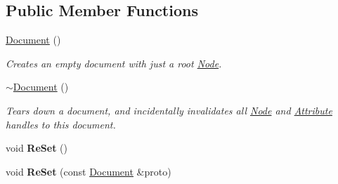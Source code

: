 \subsection*{Public Member Functions}
\begin{DoxyCompactItemize}
\item 
\hypertarget{classphys_1_1xml_1_1Document_ae1e779f0826bf3357ff77846155aad7d}{
\hyperlink{classphys_1_1xml_1_1Document_ae1e779f0826bf3357ff77846155aad7d}{Document} ()}
\label{dd/d44/classphys_1_1xml_1_1Document_ae1e779f0826bf3357ff77846155aad7d}

\begin{DoxyCompactList}\small\item\em Creates an empty document with just a root \hyperlink{classphys_1_1xml_1_1Node}{Node}. \item\end{DoxyCompactList}\item 
\hypertarget{classphys_1_1xml_1_1Document_a70013c2b670c4d4b5ee55d12e7c50be4}{
\hyperlink{classphys_1_1xml_1_1Document_a70013c2b670c4d4b5ee55d12e7c50be4}{$\sim$Document} ()}
\label{dd/d44/classphys_1_1xml_1_1Document_a70013c2b670c4d4b5ee55d12e7c50be4}

\begin{DoxyCompactList}\small\item\em Tears down a document, and incidentally invalidates all \hyperlink{classphys_1_1xml_1_1Node}{Node} and \hyperlink{classphys_1_1xml_1_1Attribute}{Attribute} handles to this document. \item\end{DoxyCompactList}\item 
\hypertarget{classphys_1_1xml_1_1Document_a2f6915579817f65c64428328f2310a02}{
void {\bfseries ReSet} ()}
\label{dd/d44/classphys_1_1xml_1_1Document_a2f6915579817f65c64428328f2310a02}

\item 
\hypertarget{classphys_1_1xml_1_1Document_a3f3caf62459ea055008edbdf2fab46be}{
void {\bfseries ReSet} (const \hyperlink{classphys_1_1xml_1_1Document}{Document} \&proto)}
\label{dd/d44/classphys_1_1xml_1_1Document_a3f3caf62459ea055008edbdf2fab46be}


\end{DoxyCompactItemize}
